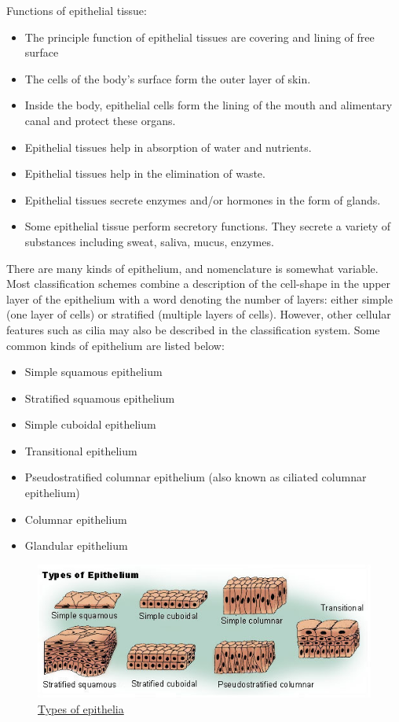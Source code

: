 Functions of epithelial tissue:

\begin{itemize}
\tightlist
\item
  The principle function of epithelial tissues are covering and lining of free surface
\item
  The cells of the body's surface form the outer layer of skin.
\item
  Inside the body, epithelial cells form the lining of the mouth and alimentary canal and protect these organs.
\item
  Epithelial tissues help in absorption of water and nutrients.
\item
  Epithelial tissues help in the elimination of waste.
\item
  Epithelial tissues secrete enzymes and/or hormones in the form of glands.
\item
  Some epithelial tissue perform secretory functions. They secrete a variety of substances including sweat, saliva, mucus, enzymes.
\end{itemize}

There are many kinds of epithelium, and nomenclature is somewhat variable. Most classification schemes combine a description of the cell-shape in the upper layer of the epithelium with a word denoting the number of layers: either simple (one layer of cells) or stratified (multiple layers of cells). However, other cellular features such as cilia may also be described in the classification system. Some common kinds of epithelium are listed below:

\begin{itemize}
\tightlist
\item
  Simple squamous epithelium
\item
  Stratified squamous epithelium
\item
  Simple cuboidal epithelium
\item
  Transitional epithelium
\item
  Pseudostratified columnar epithelium (also known as ciliated columnar epithelium)
\item
  Columnar epithelium
\item
  Glandular epithelium
\end{itemize}



\begin{figure}

{\centering \includegraphics[width=0.7\linewidth]{./figures/animals/epithelium} 

}

\caption{\href{https://commons.wikimedia.org/wiki/File:Illu_epithelium.jpg}{Types of epithelia}}\label{fig:epithelium}
\end{figure}

